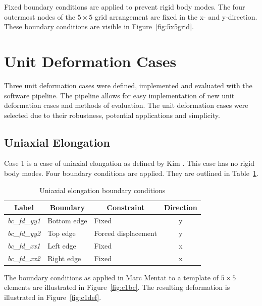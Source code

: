 Fixed boundary conditions are applied to prevent rigid body modes. The four outermost nodes of the $5\times 5$ grid arrangement are fixed in the x- and y-direction. These boundary conditions are visible in Figure~\ref{fig:5x5grid}.

\section{Unit Deformation Cases}
\label{sec:UC}

Three unit deformation cases were defined, implemented and evaluated with the software pipeline. The pipeline allows for easy implementation of new unit deformation cases and methods of evaluation. The unit deformation cases were selected due to their robustness, potential applications and simplicity.

\subsection{Uniaxial Elongation}

Case 1 is a case of uniaxial elongation as defined by Kim \citep{Kim2015}. This case has no rigid body modes. Four boundary conditions are applied. They are outlined in Table~\ref{tab:c1}.

\begin{table}[H]
\centering
\begin{tabular}{@{}lllc@{}}
\toprule
\multicolumn{1}{c}{\textbf{Label}} & \multicolumn{1}{c}{\textbf{Boundary}} & \multicolumn{1}{c}{\textbf{Constraint}} & \textbf{Direction} \\ \midrule
\textit{bc\_fd\_yy1} & Bottom edge & Fixed               & y \\
\textit{bc\_fd\_yy2} & Top edge    & Forced displacement & y \\
\textit{bc\_fd\_xx1} & Left edge   & Fixed               & x \\
\textit{bc\_fd\_xx2} & Right edge  & Fixed               & x \\ \bottomrule
\end{tabular}
\caption[Uniaxial elongation boundary conditions]{Uniaxial elongation boundary conditions \citep{Kim2015}}
\label{tab:c1}
\end{table}

The boundary conditions as applied in Marc Mentat to a template of $5\times 5$ elements are illustrated in Figure~\ref{fig:c1bc}. The resulting deformation is illustrated in Figure~\ref{fig:c1def}.

